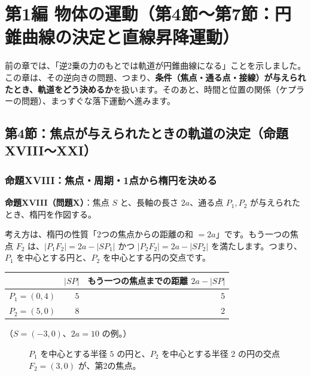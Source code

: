 \documentclass[a4paper,11pt,openany]{ltjsbook}
\begin{document}
\chapter{第1編 物体の運動（第4節〜第7節：円錐曲線の決定と直線昇降運動）}

前の章では、「逆2乗の力のもとでは軌道が円錐曲線になる」ことを示しました。この章は、その逆向きの問題、つまり、\textbf{条件（焦点・通る点・接線）が与えられたとき、軌道をどう決めるか}を扱います。そのあと、時間と位置の関係（ケプラーの問題）、まっすぐな落下運動へ進みます。

\section{第4節：焦点が与えられたときの軌道の決定（命題XVIII〜XXI）}

\subsection{命題XVIII：焦点・周期・1点から楕円を決める}

\textbf{命題XVIII（問題X）}：焦点 $S$ と、長軸の長さ $2a$、通る点 $P_1,P_2$ が与えられたとき、楕円を作図する。

考え方は、楕円の性質「$2$つの焦点からの距離の和 $=2a$」です。もう一つの焦点 $F_2$ は、$|P_1F_2|=2a-|SP_1|$ かつ $|P_2F_2|=2a-|SP_2|$ を満たします。つまり、$P_1$ を中心とする円と、$P_2$ を中心とする円の交点です。

\begin{center}
\begin{tabular}{lrr}
\toprule
 & $|SP|$ & もう一つの焦点までの距離 $2a-|SP|$\\
\midrule
$P_1=(0,4)$ & $5$ & $5$\\
$P_2=(5,0)$ & $8$ & $2$\\
\bottomrule
\end{tabular}
\end{center}

（$S=(-3,0)$、$2a=10$ の例。）

\begin{figure}[htbp]
\centering
{}
\caption{$P_1$ を中心とする半径 $5$ の円と、$P_2$ を中心とする半径 $2$ の円の交点 $F_2=(3,0)$ が、第2の焦点。}
\end{figure}
\end{document}
